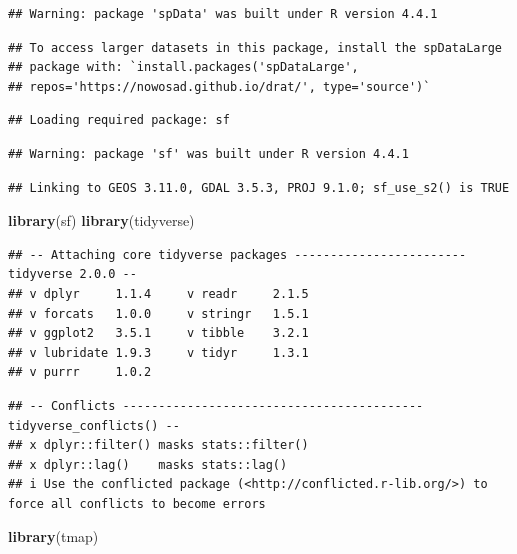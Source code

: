 \documentclass[]{article}
\newenvironment{Shaded}{\begin{snugshade}}{\end{snugshade}}
\newcommand{\FunctionTok}[1]{\textcolor[rgb]{0.13,0.29,0.53}{\textbf{#1}}}
\newcommand{\NormalTok}[1]{#1}
\begin{document}
\begin{verbatim}
## Warning: package 'spData' was built under R version 4.4.1
\end{verbatim}

\begin{verbatim}
## To access larger datasets in this package, install the spDataLarge
## package with: `install.packages('spDataLarge',
## repos='https://nowosad.github.io/drat/', type='source')`
\end{verbatim}

\begin{verbatim}
## Loading required package: sf
\end{verbatim}

\begin{verbatim}
## Warning: package 'sf' was built under R version 4.4.1
\end{verbatim}

\begin{verbatim}
## Linking to GEOS 3.11.0, GDAL 3.5.3, PROJ 9.1.0; sf_use_s2() is TRUE
\end{verbatim}

\begin{Shaded}
\begin{Highlighting}[]
\FunctionTok{library}\NormalTok{(sf)}
\FunctionTok{library}\NormalTok{(tidyverse)}
\end{Highlighting}
\end{Shaded}

\begin{verbatim}
## -- Attaching core tidyverse packages ------------------------ tidyverse 2.0.0 --
## v dplyr     1.1.4     v readr     2.1.5
## v forcats   1.0.0     v stringr   1.5.1
## v ggplot2   3.5.1     v tibble    3.2.1
## v lubridate 1.9.3     v tidyr     1.3.1
## v purrr     1.0.2
\end{verbatim}

\begin{verbatim}
## -- Conflicts ------------------------------------------ tidyverse_conflicts() --
## x dplyr::filter() masks stats::filter()
## x dplyr::lag()    masks stats::lag()
## i Use the conflicted package (<http://conflicted.r-lib.org/>) to force all conflicts to become errors
\end{verbatim}

\begin{Shaded}
\begin{Highlighting}[]
\FunctionTok{library}\NormalTok{(tmap)}
\end{Highlighting}
\end{Shaded}
\end{document}
